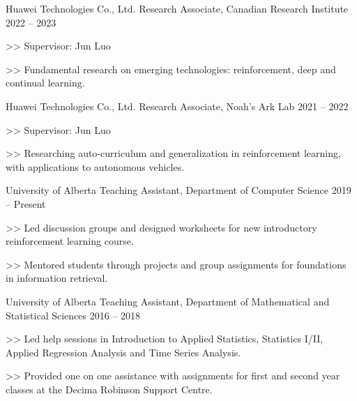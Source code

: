 \begin{cventries}
  \cventry
    {Huawei Technologies Co., Ltd.}
    {Research Associate, Canadian Research Institute}
    {2022 -- 2023}
    {
      \begin{cvitems}
        \item[>>] Supervisor: Jun Luo
        \item[>>] Fundamental research on emerging technologies: reinforcement, deep and continual learning.
      \end{cvitems}
    }

  \cventry
    {Huawei Technologies Co., Ltd.}
    {Research Associate, Noah's Ark Lab}
    {2021 -- 2022}
    {
      \begin{cvitems}
        \item[>>] Supervisor: Jun Luo
        \item[>>] Researching auto-curriculum and generalization in
        reinforcement learning, with applications to autonomous vehicles.
      \end{cvitems}
    }

  \cventry
    {University of Alberta}
    {Teaching Assistant, Department of Computer Science}
    {2019 -- Present}
    {
      \begin{cvitems}
        \item[>>] Led discussion groups and designed worksheets for new introductory reinforcement learning course.
        \item[>>] Mentored students through projects and group assignments for foundations in information retrieval.
      \end{cvitems}
    }


  \cventry
    {University of Alberta}
    {Teaching Assistant, Department of Mathematical and Statistical Sciences} {2016 -- 2018}
    {
      \begin{cvitems}
        \item[>>] Led help sessions in Introduction to Applied Statistics, Statistics I/II, Applied Regression Analysis and Time Series Analysis.
        \item[>>] Provided one on one assistance with assignments for first and second year classes at the Decima Robinson Support Centre.
      \end{cvitems}
    }


\end{cventries}
